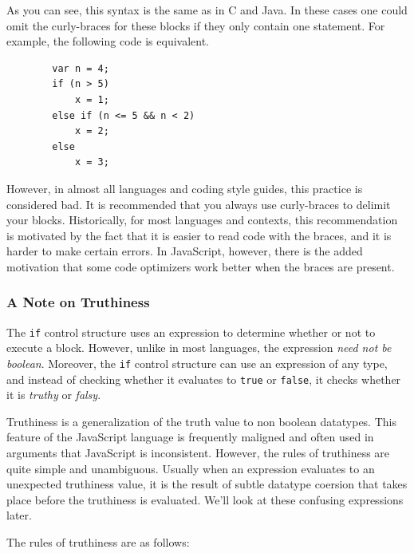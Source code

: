 \documentclass[11pt,letter]{book}
\begin{document}
    As you can see, this syntax is the same as in C and Java. In these cases one could omit the 
    curly-braces for these blocks if they only contain one statement. For example, the following 
    code is equivalent.
    
    \begin{verbatim}
        var n = 4;
        if (n > 5)
            x = 1;
        else if (n <= 5 && n < 2)
            x = 2;
        else
            x = 3;
    \end{verbatim}
    
    However, in almost all languages and coding style guides, this practice is considered bad. It is 
    recommended that you always use curly-braces to delimit your blocks. Historically, for most 
    languages and contexts, this recommendation is motivated by the fact that it is easier to read 
    code with the braces, and it is harder to make certain errors. In JavaScript, however, there is 
    the added motivation that some code optimizers work better when the braces are present.
    
    \subsubsection{A Note on Truthiness}
    The \texttt{if} control structure uses an expression to determine whether or not to execute a 
    block. However, unlike in most languages, the expression \emph{need not be boolean}. Moreover, 
    the \texttt{if} control structure can use an expression of any type, and instead of checking 
    whether it evaluates to \texttt{true} or \texttt{false}, it checks whether it is \emph{truthy}
    or \emph{falsy}.
    
    Truthiness is a generalization of the truth value to non boolean datatypes. This feature of the 
    JavaScript language is frequently maligned and often used in arguments that JavaScript is 
    inconsistent. However, the rules of truthiness are quite simple and unambiguous. Usually when an
    expression evaluates to an unexpected truthiness value, it is the result of subtle datatype 
    coersion that takes place before the truthiness is evaluated. We'll look at these confusing 
    expressions later.
    
    The rules of truthiness are as follows:
    
\end{document}
